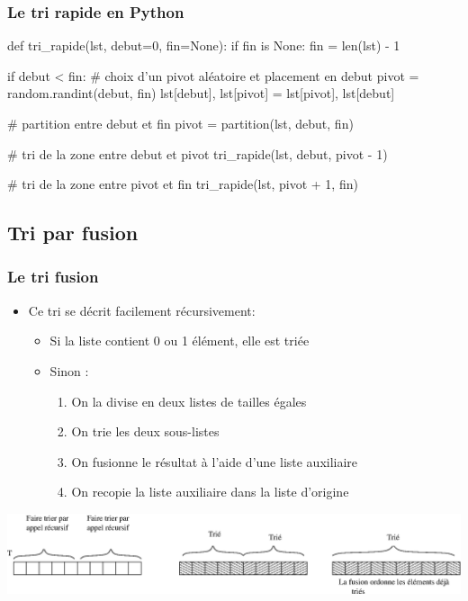 \documentclass[12pt]{linfo-beamer}
\begin{document}
\begin{frame}[fragile]
\frametitle{Le tri rapide en Python}

\scriptsize
\begin{pyframe}{}
def tri_rapide(lst, debut=0, fin=None):
    if fin is None:
        fin = len(lst) - 1

    if debut < fin:
        # choix d'un pivot aléatoire et placement en debut
        pivot = random.randint(debut, fin)
        lst[debut], lst[pivot] = lst[pivot], lst[debut]

        # partition entre debut et fin
        pivot = partition(lst, debut, fin)

        # tri de la zone entre debut et pivot
        tri_rapide(lst, debut, pivot - 1)

        # tri de la zone entre pivot et fin
        tri_rapide(lst, pivot + 1, fin)
\end{pyframe}
\end{frame}


\subsection{Tri par fusion}

\begin{frame}
    \frametitle{Le tri fusion}
\begin{itemize}
    \item
Ce tri se d\'ecrit facilement r\'ecursivement:\\
\begin{itemize}
\item Si la liste contient 0 ou 1 élément, elle est triée
\item Sinon :
\begin{enumerate}
    \item On la divise en deux listes de tailles égales
    \item On trie les deux sous-listes
    \item On fusionne le résultat à l'aide d'une liste auxiliaire
    \item On recopie la liste auxiliaire dans la liste d'origine
\end{enumerate}
\end{itemize}
\end{itemize}
\begin{center}
\includegraphics[scale=.5]{fusion.eps}
\end{center}
\end{frame}
\end{document}
